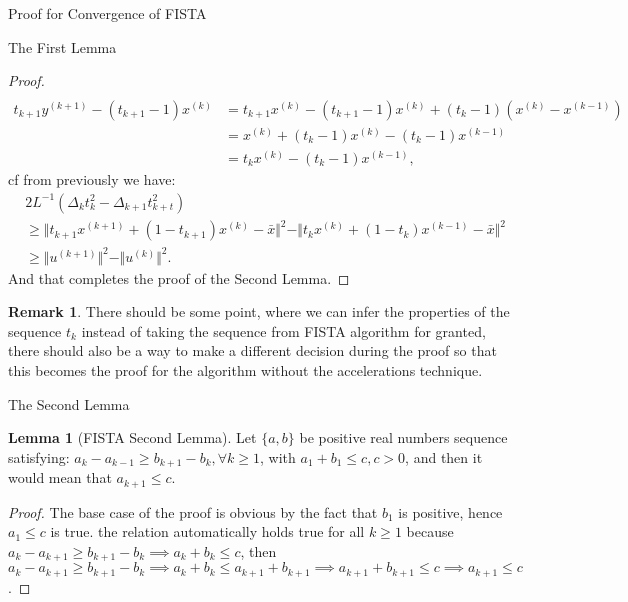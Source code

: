 \documentclass[]{article}
\theoremstyle{definition}
\newtheorem{lemma}{Lemma}[subsection]  %
\newtheorem{remark}{Remark}[subsection]
{
    \newtheorem{assumption}{Assumption}
}
\begin{document}
\begin{section}{Proof for Convergence of FISTA}
\begin{subsection}{The First Lemma}
\begin{proof}
\begin{align*}
                \\
                t_{k + 1}y^{(k + 1)} - (t_{k + 1}- 1)x^{(k)}
                &= t_{k + 1}x^{(k)} - (t_{k + 1}- 1)x^{(k)} + (t_k - 1)(x^{(k)} - x^{(k - 1)})
                \\
                &= 
                x^{(k)} + (t_k - 1)x^{(k)} - (t_k - 1)x^{(k - 1)}
                \\
                &= t_kx^{(k)} - (t_k - 1)x^{(k - 1)}, 
            \end{align*}
            cf from previously we have: 
            \begin{align*}
                & 2L^{-1}(\Delta_k t_k^2 - \Delta_{k + 1}t_{k + t}^2)
                \\
                &\ge 
                \Vert 
                    t_{k + 1}x^{(k + 1)}
                    + 
                    (1 - t_{k + 1}) x^{(k)} - \bar x
                \Vert^2
                - 
                \Vert t_kx^{(k)} + (1 - t_k)x^{(k -1)} - \bar x\Vert^2
                \\
                & \ge \Vert u^{(k + 1)}\Vert^2 - \Vert u^{(k)}\Vert^2.
            \end{align*}
            And that completes the proof of the Second Lemma. 
        \end{proof}
        \begin{remark}
            There should be some point, where we can infer the properties of the sequence $t_k$ instead of taking the sequence from FISTA algorithm for granted, there should also be a way to make a different decision during the proof so that this becomes the proof for the algorithm without the accelerations technique. 
        \end{remark}
    \end{subsection}

    \begin{subsection}{The Second Lemma}
        \begin{lemma}[FISTA Second Lemma]
            Let $\{a, b\}$ be positive real numbers sequence satisfying: $a_k - a_{k - 1}\ge b_{k + 1} - b_k, \forall k \ge 1$, with $a_1 + b_1 \le c, c > 0$, and then it would mean that $a_{k + 1}\le c$. 
        \end{lemma}
        \begin{proof}
            The base case of the proof is obvious by the fact that $b_1$ is positive, hence $a_1 \le c$ is true. the relation automatically holds true for all $k\ge 1$ because $a_k - a_{k + 1}\ge b_{k + 1} - b_k \implies a_k + b_k \le c$, then $a_k - a_{k + 1}\ge b_{k + 1} - b_k \implies a_k + b_k \le a_{k + 1} + b_{k + 1} \implies a_{k + 1} + b_{k + 1} \le c\implies a_{k + 1}\le c$. 
        \end{proof}
    \end{subsection}


\end{section}
\end{document}
